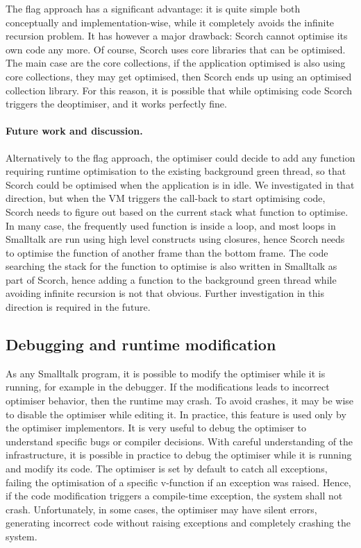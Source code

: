 \documentclass[a4paper,12pt,twoside]{../includes/ThesisStyle}
\begin{document}
The flag approach has a significant advantage: it is quite simple both conceptually and implementation-wise, while it completely avoids the infinite recursion problem. It has however a major drawback: Scorch cannot optimise its own code any more. Of course, Scorch uses core libraries that can be optimised. The main case are the core collections, if the application optimised is also using core collections, they may get optimised, then Scorch ends up using an optimised collection library. For this reason, it is possible that while optimising code Scorch triggers the deoptimiser, and it works perfectly fine.

\paragraph{Future work and discussion.} Alternatively to the flag approach, the optimiser could decide to add any function requiring runtime optimisation to the existing background green thread, so that Scorch could be optimised when the application is in idle. We investigated in that direction, but when the VM triggers the call-back to start optimising code, Scorch needs to figure out based on the current stack what function to optimise. In many case, the frequently used function is inside a loop, and most loops in Smalltalk are run using high level constructs using closures, hence Scorch needs to optimise the function of another frame than the bottom frame. The code searching the stack for the function to optimise is also written in Smalltalk as part of Scorch, hence adding a function to the background green thread while avoiding infinite recursion is not that obvious. Further investigation in this direction is required in the future.

\subsection{Debugging and runtime modification}


As any Smalltalk program, it is possible to modify the optimiser while it is running, for example in the debugger. If the modifications leads to incorrect optimiser behavior, then the runtime may crash. To avoid crashes, it may be wise to disable the optimiser while editing it. In practice, this feature is used only by the optimiser implementors. It is very useful to debug the optimiser to understand specific bugs or compiler decisions. With careful understanding of the infrastructure, it is possible in practice to debug the optimiser while it is running and modify its code. The optimiser is set by default to catch all exceptions, failing the optimisation of a specific v-function if an exception was raised. Hence, if the code modification triggers a compile-time exception, the system shall not crash. Unfortunately, in some cases, the optimiser may have silent errors, generating incorrect code without raising exceptions and completely crashing the system.
\end{document}
